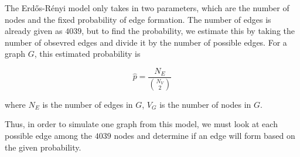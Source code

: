 \documentclass[12pt,twoside]{amherstthesis}
\begin{document}
  The Erdős-Rényi model only takes in two parameters, which are the number
  of nodes and the fixed probability of edge formation. The number of
  edges is already given as \(4039\), but to find the probability, we
  estimate this by taking the number of obsevred edges and divide it by
  the number of possible edges. For a graph \(G\), this estimated
  probability is
  
  \[\hat{p} = \frac {N_{E}} {{N_{V} \choose 2}}\]
  
  where \(N_{E}\) is the number of edges in \(G\), \(V_G\) is the number
  of nodes in \(G\).
  
  Thus, in order to simulate one graph from this model, we must look at
  each possible edge among the \(4039\) nodes and determine if an edge
  will form based on the given probability.
  
\end{document}
